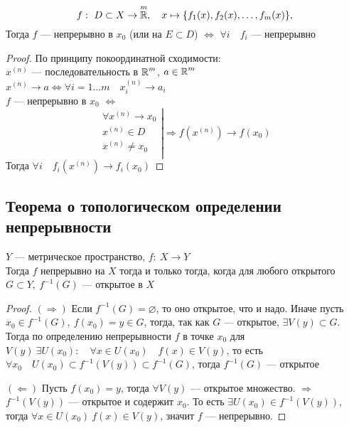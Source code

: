 \begin{remark}
$$f: \  D \subset X \rightarrow \operatorname*{\mathbb{R}}^m, \quad x \mapsto \{f_1(x), f_2(x), \dots, f_m(x)\},$$
Тогда $f$ --- непрерывно в $x_0$ (или на $E \subset D$) $\Leftrightarrow$ $\forall i \quad f_i$ --- непрерывно
\end{remark}

\begin{proof}
По принципу покоординатной сходимости: \\
$x^{(n)}$ --- последовательность в $\operatorname*{\mathbb{R}}^m$, $a \in \operatorname*{\mathbb{R}}^m$ \\
$x^{(n)} \rightarrow a \Leftrightarrow \forall i = 1 \dots m \quad x^{(n)}_i \rightarrow a_i$ \\
$f$ --- непрерывно в $x_0$ $\Leftrightarrow$
$$
\left. \begin{array}{r}
\forall x^{(n)} \rightarrow x_0 \\
x^{(n)} \in D \\
x^{(n)} \neq x_0 \\
\end{array} \right| 
\Rightarrow
f(x^{(n)}) \rightarrow f(x_0)
$$
Тогда $\forall i \quad f_i(x^{(n)}) \rightarrow f_i(x_0)$
\end{proof}
\newpage
\subsection{Теорема о топологическом определении непрерывности}
\begin{theorem*} 
$Y$ --- метрическое пространство, $f: \  X \rightarrow Y$ \\
Тогда $f$ непрерывно на $X$ тогда и только тогда, когда для любого открытого $G \subset Y, \  f^{-1}(G)$ --- открытое в $X$
\end{theorem*}

\begin{proof}
$(\Rightarrow)$ Если $f^{-1}(G) = \varnothing$, то оно открытое, что и надо. 
Иначе пусть $x_0 \in f^{-1}(G), \ f(x_0) = y \in G$, 
тогда, так как $G$ --- открытое, $\exists V(y) \subset G$. 
Тогда по определению непрерывности $f$ в точке $x_0$ для $V(y) \  \exists U(x_0): \quad \forall x \in U(x_0) \quad f(x) \in V(y)$, 
то есть $\forall x_0 \quad U(x_0) \subset f^{-1}(V(y)) \subset f^{-1}(G)$, 
тогда $f^{-1}(G)$ --- открытое


$(\Leftarrow)$ Пусть $f(x_0) = y$, тогда $\forall V(y)$ --- открытое множество. $\Rightarrow$ $f^{-1}(V(y))$ --- открытое и содержит $x_0$. То есть $\exists U(x_0) \in f^{-1}(V(y))$, тогда $\forall x \in U(x_0) \  f(x) \in V(y)$, значит $f$ --- непрерывно.
\end{proof}
\newpage
